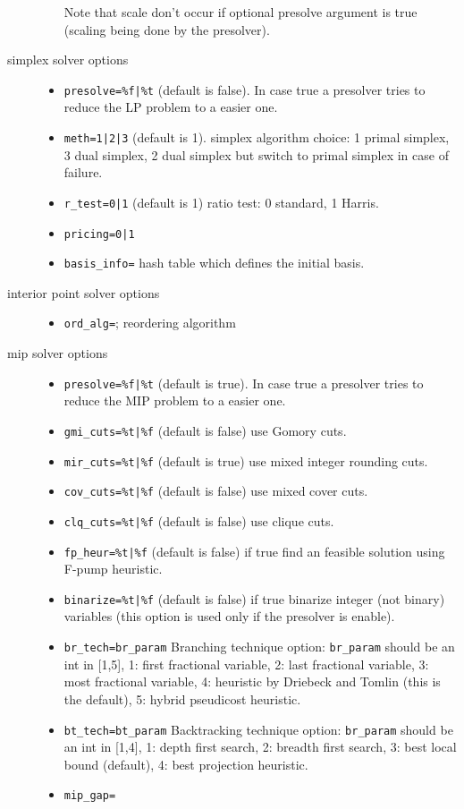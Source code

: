 \begin{mandescription}
\begin{description}
\begin{itemize}
\begin{tabular}{|c|l|}
      \end{tabular}
      Note that scale don't occur if optional presolve argument is true (scaling being done by the presolver). 
\end{itemize}
\item[simplex solver options]
\begin{itemize}
\item \verb+presolve=%f|%t+ (default is false). In case true a presolver tries to reduce
      the LP problem to a easier one.
\item \verb+meth=1|2|3+ (default is 1). simplex algorithm choice: 1 primal simplex, 3 dual simplex, 2 
      dual simplex but switch to primal simplex in case of failure.
\item \verb+r_test=0|1+ (default is 1) ratio test: 0 standard, 1 Harris.
\item \verb+pricing=0|1+
\item \verb+basis_info=+  hash table which defines the initial basis.
\end{itemize}
\item[interior point solver options]
\begin{itemize}
\item \verb+ord_alg=+; reordering algorithm
\end{itemize}
\item[mip solver options]
\begin{itemize}
\item \verb+presolve=%f|%t+ (default is true). In case true a presolver tries to reduce
      the MIP problem to a easier one.
\item \verb+gmi_cuts=%t|%f+ (default is false) use Gomory cuts.
\item \verb+mir_cuts=%t|%f+ (default is true) use mixed integer rounding cuts.
\item \verb+cov_cuts=%t|%f+ (default is false) use mixed cover cuts.
\item \verb+clq_cuts=%t|%f+ (default is false) use clique cuts.
\item \verb+fp_heur=%t|%f+ (default is false) if true find an feasible solution using F-pump heuristic.
\item \verb+binarize=%t|%f+ (default is false) if true binarize integer (not binary) variables (this 
      option is used only if the presolver is enable).
\item \verb+br_tech=br_param+ Branching technique option: \verb+br_param+ should be an int in [1,5],
      1: first fractional variable, 2: last fractional variable, 3: most fractional variable, 4:
      heuristic by Driebeck and Tomlin (this is the default), 5: hybrid pseudicost heuristic.
\item \verb+bt_tech=bt_param+ Backtracking technique option:  \verb+br_param+ should be an int in [1,4],
      1: depth first search, 2: breadth first search, 3: best local bound (default), 4: best projection heuristic.
\item \verb+mip_gap=+
\end{itemize}
\end{description}


\end{mandescription}
